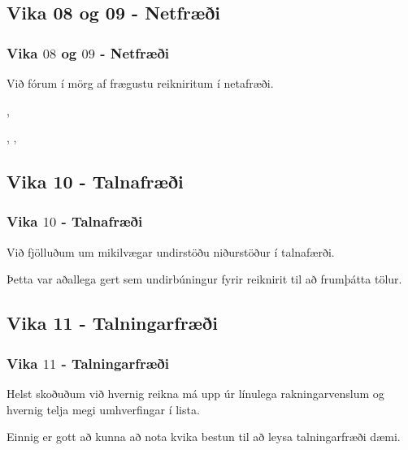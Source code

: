 \subsection{Vika 08 og 09 - Netfræði}
{
    \frametitle{Vika $08$ og $09$ - Netfræði}
    {
        \item<1-> Við fórum í mörg af frægustu reikniritum í netafræði.
        {
            \item<2-> , 
            \item<3-> , , 
            \item<4-> 
            \item<5->   
            \item<6-> 
        }
    }
}

\subsection{Vika 10 - Talnafræði}
{
    \frametitle{Vika $10$ - Talnafræði}
    {
        \item<1-> Við fjölluðum um mikilvægar undirstöðu niðurstöður í talnafærði.
        \item<2-> Þetta var aðallega gert sem undirbúningur fyrir reiknirit til að frumþátta tölur.
        {
            \item<3-> 
            \item<4->   
            \item<5->   
        }
    }
}

\subsection{Vika 11 - Talningarfræði}
{
    \frametitle{Vika $11$ - Talningarfræði}
    {
        \item<1-> Helst skoðuðum við hvernig reikna má upp úr línulega rakningarvenslum og hvernig telja megi umhverfingar í lista.
        {
            \item<2->   
            \item<3->   
        }
        \item<4-> Einnig er gott að kunna að nota kvika bestun til að leysa talningarfræði dæmi.
    }
}

